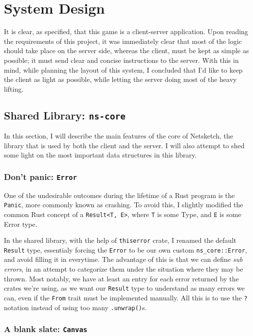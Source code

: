\documentclass{article}
\newcommand{\code}[1]{\texttt{#1}}
\begin{document}

\section{System Design}
It is clear, as specified, that this game is a client-server application. Upon
reading the requirements of this project, it was immediately clear that most of
the logic should take place on the server side, whereas the client, must be kept
as simple as possible; it must send clear and concise instructions to the server.
With this in mind, while planning the layout of this system, I concluded that
I'd like to keep the client as light as possible, while letting the server doing
most of the heavy lifting.

\subsection{Shared Library: \code{ns-core}}
In this section, I will describe the main features of the core of Netsketch, the library that is used by both the client and the server. I will also attempt to shed some light on the most important data structures in this library.

\subsubsection{Don't panic: \code{Error}}

One of the undesirable outcomes during the lifetime of a Rust program is the
\code{Panic}, more commonly known as crashing. To avoid this, I slightly
modified the common Rust concept of a \code{Result<T, E>}, where \code{T} is some Type, and \code{E} is some Error type.

In the shared library, with the help of \code{thiserror} crate, I renamed the default \code{Result} type, essentialy forcing the \code{Error} to be our own custom \code{ns\_core::Error}, and avoid filling it in everytime. The advantage of this is that we can define \textit{sub errors}, in an attempt to categorize them under the situation where they may be thrown. Most notably, we have at least an entry for each error returned by the crates we're using, as we want our \code{Result} type to understand as many errors we can, even if the \code{From} trait must be implemented manually. All this is to use the \code{?} notation instead of using too many \code{.unwrap()}s.


\label{sec:canvas}
\subsubsection{A blank slate: \code{Canvas}}
\end{document}
